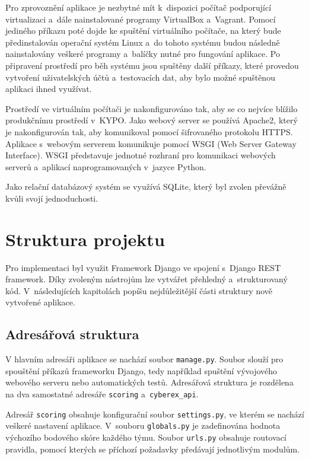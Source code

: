 \documentclass[
  digital,
  twoside,
  table, 
  nolof, 
  nolot
]{fithesis3}
\begin{document}
Pro zprovoznění aplikace je nezbytné mít k~dispozici počítač podporující virtualizaci a~dále nainstalované programy VirtualBox \cite{virtualbox} a~Vagrant. Pomocí jediného příkazu poté dojde ke spuštění virtuálního počítače, na který bude předinstalován operační systém Linux a~do tohoto systému budou následně nainstalovány veškeré programy a~balíčky nutné pro fungování aplikace. Po připravení prostředí pro běh systému jsou spuštěny další příkazy, které provedou vytvoření uživatelských účtů a~testovacích dat, aby bylo možné spuštěnou aplikaci ihned využívat. 

Prostředí ve virtuálním počítači je nakonfigurováno tak, aby se co nejvíce blížilo produkčnímu prostředí v~KYPO. Jako webový server se používá Apache2, který je nakonfigurován tak, aby komunikoval pomocí šifrovaného protokolu HTTPS. Aplikace s~webovým serverem komunikuje pomocí WSGI (Web Server Gateway Interface). WSGI představuje jednotné rozhraní pro komunikaci webových serverů a~aplikací naprogramovaných v~jazyce Python.

Jako relační databázový systém se využívá SQLite, který byl zvolen převážně kvůli svojí jednoduchosti.

\section{Struktura projektu}
Pro implementaci byl využit Framework Django ve spojení s~Django REST framework. Díky zvoleným nástrojům lze vytvářet přehledný a~strukturovaný kód. V~následujících kapitolách popíšu nejdůležitější části struktury nově vytvořené aplikace.

\subsection{Adresářová struktura}
V hlavním adresáři aplikace se nachází soubor \texttt{manage.py}. Soubor slouží pro spouštění příkazů frameworku Django, tedy například spuštění vývojového webového serveru nebo automatických testů. Adresářová struktura je rozdělena na dva samostatné adresáře \texttt{scoring} a~\texttt{cyberex\_api}.

Adresář \texttt{scoring} obsahuje konfigurační soubor \texttt{settings.py}, ve kterém se nachází veškeré nastavení aplikace. V~souboru \texttt{globals.py} je zadefinována hodnota výchozího bodového skóre každého týmu. Soubor \texttt{urls.py} obsahuje routovací pravidla, pomocí kterých se příchozí požadavky předávají jednotlivým modulům.
\end{document}
